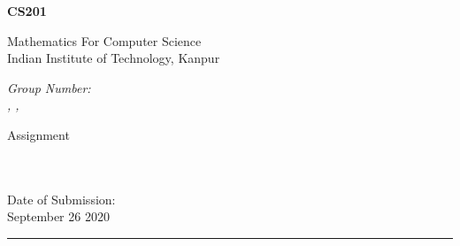 \newcommand{\courseNumb}{CS201}
\newcommand{\courseName}{Mathematics For Computer Science}
\newcommand{\subDate}{September 26 2020}
\newcommand{\assignNumb}{1}

\begin{minipage}[t]{0.50\linewidth}
    \begin{flushleft}
        {\huge \textbf{\courseNumb}}\\
        \rule{0mm}{8mm}%
        {\large \courseName}\\
        {\normalsize Indian Institute of Technology, Kanpur}\\
        \rule{0mm}{8mm}%
        {\large \itshape Group Number: \GroupNum}\\
        {\normalsize \textit{\MembAName, \MembBName, \MembCName}}
    \end{flushleft}

\end{minipage}
\hfill
\begin{minipage}[t]{0.40\linewidth}
    \centering
    {\huge Assignment}\\ \rule{0mm}{15mm} \scalebox{5}{\assignNumb}\\~\\
        Date of Submission:\\ \subDate

\end{minipage}

\rule{0mm}{0.5mm}%

{\centering \rule{0.99\linewidth}{1pt} }